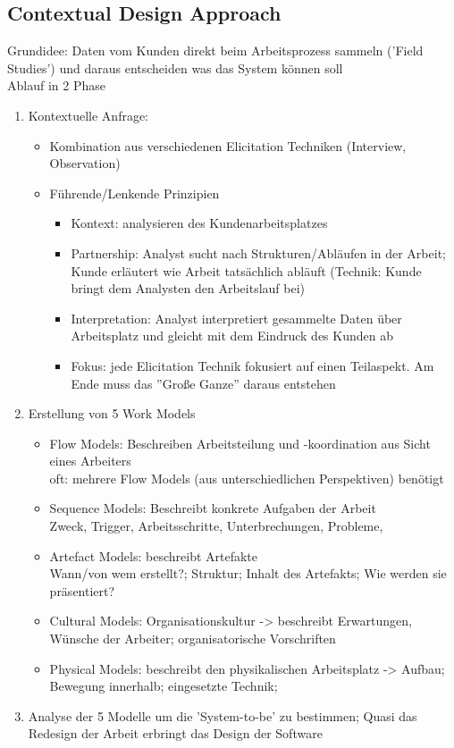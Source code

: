 \subsection{Contextual Design Approach}
Grundidee: Daten vom Kunden direkt beim Arbeitsprozess sammeln ('Field Studies') und daraus entscheiden was das System können soll\\
Ablauf in 2 Phase
\begin{enumerate}
	\item Kontextuelle Anfrage:
	\begin{itemize}
		\item Kombination aus verschiedenen Elicitation Techniken (Interview, Observation)
		\item Führende/Lenkende Prinzipien
		\begin{itemize}
			\item Kontext: analysieren des Kundenarbeitsplatzes
			\item Partnership: Analyst sucht nach Strukturen/Abläufen in der Arbeit; Kunde erläutert wie Arbeit tatsächlich abläuft (Technik: Kunde bringt dem Analysten den Arbeitslauf bei)
			\item Interpretation: Analyst interpretiert gesammelte Daten über Arbeitsplatz und gleicht mit dem Eindruck des Kunden ab
			\item Fokus: jede Elicitation Technik fokusiert auf einen Teilaspekt. Am Ende muss das ''Große Ganze'' daraus entstehen
		\end{itemize}
	\end{itemize}

	\item Erstellung von 5 Work Models
	\begin{itemize}
		\item Flow Models: Beschreiben Arbeitsteilung und -koordination aus Sicht eines Arbeiters\\
		oft: mehrere Flow Models (aus unterschiedlichen Perspektiven) benötigt
		\item Sequence Models: Beschreibt konkrete Aufgaben der Arbeit\\
		Zweck, Trigger, Arbeitsschritte, Unterbrechungen, Probleme,
		\item Artefact Models: beschreibt Artefakte\\
		Wann/von wem erstellt?; Struktur; Inhalt des Artefakts; Wie werden sie präsentiert?
		\item Cultural Models: Organisationskultur -> beschreibt Erwartungen, Wünsche der Arbeiter; organisatorische Vorschriften
		\item Physical Models: beschreibt den physikalischen Arbeitsplatz -> Aufbau; Bewegung innerhalb; eingesetzte Technik;
	\end{itemize}
	\item Analyse der 5 Modelle um die 'System-to-be' zu bestimmen; Quasi das Redesign der Arbeit erbringt das Design der Software
\end{enumerate} 